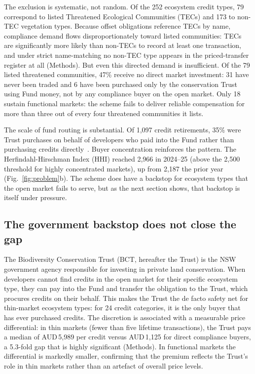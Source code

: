 \documentclass[pdflatex,sn-nature,oneside]{sn-jnl}
\begin{document}
The exclusion is systematic, not random.
Of the 252 ecosystem credit types, 79 correspond to listed Threatened
Ecological Communities (TECs) and 173 to non-TEC vegetation types.
Because offset obligations reference TECs by name, compliance demand
flows disproportionately toward listed communities: TECs are
significantly more likely than non-TECs to record at least one transaction,
and under strict name-matching no non-TEC type appears in the priced-transfer
register at all (Methods).
But even this directed demand is insufficient.
Of the 79 listed threatened communities, 47\% receive no direct market
investment: 31 have never been traded and 6 have been purchased only by
the conservation Trust using Fund money, not by any compliance buyer on
the open market.
Only 18 sustain functional markets: the scheme fails to deliver
reliable compensation for more than three out of every four threatened
communities it lists.

The scale of fund routing is substantial.
Of 1,097 credit retirements, 35\% were Trust purchases on behalf of
developers who paid into the Fund rather than purchasing credits
directly~\cite{IPART2024}.
Buyer concentration reinforces the pattern.
The Herfindahl-Hirschman Index (HHI) reached 2,966 in 2024--25 (above the 2,500
threshold for highly concentrated markets), up from 2,187 the prior
year~\cite{IPART2025} (Fig.~\ref{fig:problem}b).
The scheme does have a backstop for ecosystem types that the open market
fails to serve, but as the next section shows, that backstop is itself
under pressure.

\subsection*{The government backstop does not close the gap}

The Biodiversity Conservation Trust (BCT, hereafter the Trust) is the
NSW government agency responsible for investing in private land
conservation. When developers cannot find credits in the open market
for their specific ecosystem type, they can pay into the Fund and
transfer the obligation to the Trust, which procures credits on their
behalf. This makes the Trust the de facto safety net for thin-market
ecosystem types: for 24 credit categories, it is the only buyer that
has ever purchased credits.
The discretion is associated with a measurable price differential: in
thin markets (fewer than five lifetime transactions), the Trust pays a
median of AUD\,5,989 per credit versus AUD\,1,125 for direct compliance
buyers, a 5.3-fold gap that is highly significant (Methods).
In functional markets the differential is markedly
smaller, confirming that the premium reflects the Trust's role in
thin markets rather than an artefact of overall price levels.
\end{document}
